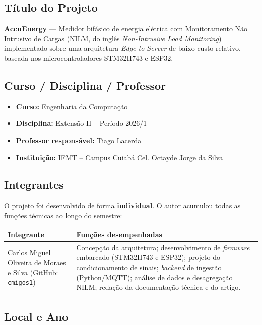 \documentclass[12pt,a4paper]{article}
\begin{document}
\subsection{T\'itulo do Projeto}

\textbf{AccuEnergy} --- Medidor bif\'asico de energia el\'etrica com Monitoramento
N\~ao Intrusivo de Cargas (NILM, do ingl\^es \textit{Non-Intrusive Load
Monitoring}) implementado sobre uma arquitetura \textit{Edge-to-Server} de baixo
custo relativo, baseada nos microcontroladores STM32H743 e ESP32.

\subsection{Curso / Disciplina / Professor}

\begin{itemize}[nosep]
  \item \textbf{Curso:} Engenharia da Computa\c{c}\~ao
  \item \textbf{Disciplina:} Extens\~ao II -- Per\'iodo 2026/1
  \item \textbf{Professor respons\'avel:} Tiago Lacerda
  \item \textbf{Institui\c{c}\~ao:} IFMT -- Campus Cuiab\'a Cel. Octayde Jorge da Silva
\end{itemize}

\subsection{Integrantes}

O projeto foi desenvolvido de forma \textbf{individual}. O autor acumulou todas as
fun\c{c}\~oes t\'ecnicas ao longo do semestre:

\begin{longtable}{p{4.5cm} p{9.5cm}}
\toprule
\textbf{Integrante} & \textbf{Fun\c{c}\~oes desempenhadas} \\
\midrule
\endhead
Carlos Miguel Oliveira de Moraes e Silva \newline (GitHub: \texttt{cmigos1}) &
Concep\c{c}\~ao da arquitetura; desenvolvimento de \textit{firmware} embarcado
(STM32H743 e ESP32); projeto do condicionamento de sinais; \textit{backend} de
ingest\~ao (Python/MQTT); an\'alise de dados e desagrega\c{c}\~ao NILM; reda\c{c}\~ao
da documenta\c{c}\~ao t\'ecnica e do artigo. \\
\bottomrule
\end{longtable}

\subsection{Local e Ano}
\end{document}

